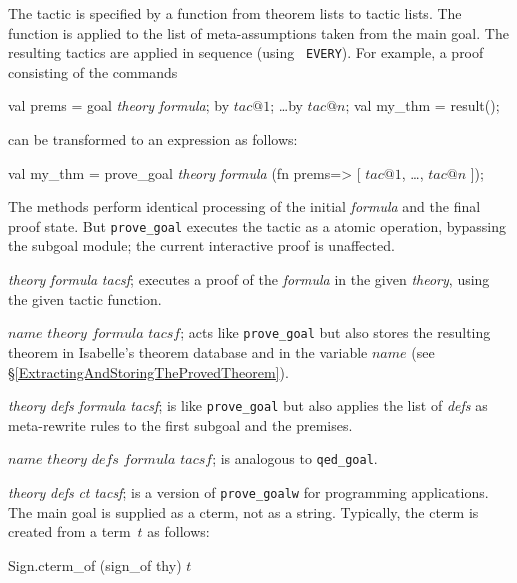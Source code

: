 The tactic is specified by a function from theorem lists to tactic lists.
The function is applied to the list of meta-assumptions taken from
the main goal.  The resulting tactics are applied in sequence (using {\tt
  EVERY}).  For example, a proof consisting of the commands
\begin{ttbox} 
val prems = goal {\it theory} {\it formula};
by \(tac@1\);  \ldots  by \(tac@n\);
val my_thm = result();
\end{ttbox}
can be transformed to an expression as follows:
\begin{ttbox} 
val my_thm = prove_goal {\it theory} {\it formula}
 (fn prems=> [ \(tac@1\), \ldots, \(tac@n\) ]);
\end{ttbox}
The methods perform identical processing of the initial {\it formula} and
the final proof state.  But {\tt prove_goal} executes the tactic as a
atomic operation, bypassing the subgoal module; the current interactive
proof is unaffected.
%
\begin{ttdescription}
\item[\ttindexbold{prove_goal} {\it theory} {\it formula} {\it tacsf};] 
executes a proof of the {\it formula\/} in the given {\it theory}, using
the given tactic function.

\item[\ttindexbold{qed_goal} $name$ $theory$ $formula$ $tacsf$;]
acts like {\tt prove_goal} but also stores the resulting theorem in
Isabelle's theorem database and in the {\ML} variable $name$ (see
\S\ref{ExtractingAndStoringTheProvedTheorem}).

\item[\ttindexbold{prove_goalw} {\it theory} {\it defs} {\it formula} 
      {\it tacsf};]
is like {\tt prove_goal} but also applies the list of {\it defs\/} as
meta-rewrite rules to the first subgoal and the premises.

\item[\ttindexbold{qed_goalw} $name$ $theory$ $defs$ $formula$ $tacsf$;]
is analogous to {\tt qed_goal}.

\item[\ttindexbold{prove_goalw_cterm} {\it theory} {\it defs} {\it ct}
      {\it tacsf};] 
is a version of {\tt prove_goalw} for programming applications.  The main
goal is supplied as a cterm, not as a string.  Typically, the cterm is
created from a term~$t$ as follows:
\begin{ttbox}
Sign.cterm_of (sign_of thy) \(t\)
\end{ttbox}
\end{ttdescription}


